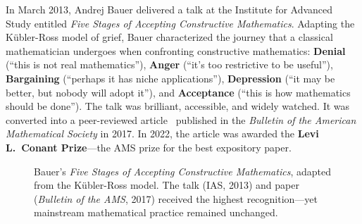 \documentclass[11pt,a4paper]{report}
\theoremstyle{plain}
\theoremstyle{definition}
\theoremstyle{remark}
\begin{document}
In March 2013, Andrej Bauer delivered a talk at the Institute for Advanced Study entitled \emph{Five Stages of Accepting Constructive Mathematics}. Adapting the K\"ubler-Ross model of grief, Bauer characterized the journey that a classical mathematician undergoes when confronting constructive mathematics: \textbf{Denial} (``this is not real mathematics''), \textbf{Anger} (``it's too restrictive to be useful''), \textbf{Bargaining} (``perhaps it has niche applications''), \textbf{Depression} (``it may be better, but nobody will adopt it''), and \textbf{Acceptance} (``this is how mathematics should be done''). The talk was brilliant, accessible, and widely watched. It was converted into a peer-reviewed article~\cite{Bauer2017} published in the \emph{Bulletin of the American Mathematical Society} in 2017. In 2022, the article was awarded the \textbf{Levi L.\ Conant Prize}---the AMS prize for the best expository paper.

\begin{figure}[t]
\centering
{}
\caption{Bauer's \emph{Five Stages of Accepting Constructive Mathematics}, adapted from the K\"ubler-Ross model. The talk (IAS, 2013) and paper (\emph{Bulletin of the AMS}, 2017) received the highest recognition---yet mainstream mathematical practice remained unchanged.}
\label{fig:fivestages}
\end{figure}
\end{document}
